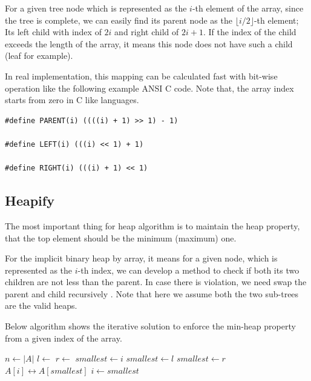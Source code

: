 \documentclass[b5paper]{article}
\begin{document}
For a given tree node which is represented as the $i$-th element of the
array, since the tree is complete, we can easily find its parent node
as the $\lfloor i/2 \rfloor$-th element; Its left child
with index of $2i$ and right child of $2i+1$. If the index
of the child exceeds the length of the array, it means this
node does not have such a child (leaf for example).

In real implementation, this mapping can be calculated fast
with bit-wise operation like the following example ANSI C code.
Note that, the array index starts from zero in C like
languages.

\lstset{language=C}
\begin{lstlisting}
#define PARENT(i) ((((i) + 1) >> 1) - 1)

#define LEFT(i) (((i) << 1) + 1)

#define RIGHT(i) (((i) + 1) << 1)
\end{lstlisting}

\subsection{Heapify}

The most important thing for heap algorithm is to maintain the heap
property, that the top element should be the minimum (maximum) one.

For the implicit binary heap by array, it means for a given node,
which is represented as the $i$-th index, we can develop a method
to check if both its two children are not less than the parent. In case
there is violation, we need swap the parent and child recursively \cite{CLRS}.
Note that here we assume both the two sub-trees are the valid heaps.

Below algorithm shows the iterative solution to enforce the min-heap
property from a given index of the array.

\begin{algorithmic}[1]
  \State $n \gets |A|$
  \Loop
    \State $l \gets$ 
    \State $r \gets$ 
    \State $smallest \gets i$
      \State $smallest \gets l$
    \EndIf
      \State $smallest \gets r$
    \EndIf
      \State {} $A[i] \leftrightarrow A[smallest]$
      \State $i \gets smallest$
    \Else
      \State \Return
    \EndIf
  \EndLoop
\EndFunction
\end{algorithmic}
\end{document}
